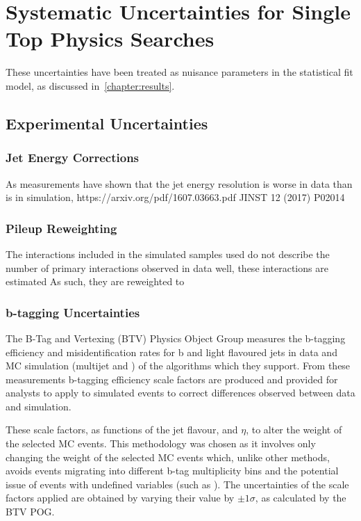 \chapter{Systematic Uncertainties for Single Top Physics Searches}\label{chapter:tzq-systematics}


These uncertainties have been treated as nuisance parameters in the statistical fit model, as discussed in~\ref{chapter:results}.

\section{Experimental Uncertainties}
\subsection{Jet Energy Corrections}
As measurements have shown that the jet energy resolution is worse in data than is in simulation, 
https://arxiv.org/pdf/1607.03663.pdf
JINST 12 (2017) P02014
\subsection{Pileup Reweighting}
The \PU interactions included in the simulated samples used do not describe the number of primary interactions observed in data well, these interactions are estimated 
As such, they are reweighted to 

\subsection{b-tagging Uncertainties}
The B-Tag and Vertexing (BTV) Physics Object Group measures the b-tagging efficiency and misidentification rates for b and light flavoured jets in data and MC simulation (multijet and \ttbar) of the algorithms which they support.
From these measurements b-tagging efficiency scale factors are produced and provided for analysts to apply to simulated events to correct differences observed between data and simulation.

These scale factors, as functions of the jet flavour, \pT and $\eta$, to alter the weight of the selected MC events.
This methodology was chosen as it involves only changing the weight of the selected MC events which, unlike other methods, avoids events migrating into different b-tag multiplicity bins and the potential issue of events with undefined variables (such as ).
The uncertainties of the scale factors applied are obtained by varying their value by $\pm 1\sigma$, as calculated by the BTV POG. 

